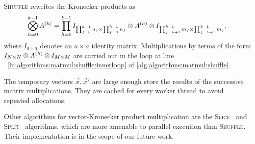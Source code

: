 \begin{itemize}
  \textsc{Shuffle} rewrites the Kronecker products as
  \begin{equation}
    \bigotimes_{h = 0}^{k - 1} A^{(h)} = \prod_{h = 0}^{k - 1}
    I_{\prod_{f = 0}^{h - 1} n_f \times \prod_{f = 0}^{h - 1} n_f} \otimes
    A^{(h)} \otimes I_{\prod_{f = h + 1}^{k - 1} m_f \times
      \prod_{f = h + 1}^{k - 1} m_f} \text,
  \end{equation}
  where $I_{a \times a}$ denotes an $a \times a$ identity matrix.
  Multiplications by terms of the form
  $I_{N \times N} \otimes A^{(h)} \otimes I_{M \times M}$ are
  carried out in the loop at line%
  ~\ref{ln:algorithms:matmul:shuffle:innerloop} of
  \cref{alg:algorithms:matmul:shuffle}.

  The temporary vectors $\vec{x}, \vec{x}'$ are large enough store the
  results of the successive matrix multiplications. They are cached
  for every worker thread to avoid repeated allocations.

  Other algorithms for vector-Kronecker product multiplication are the
  \textsc{Slice}~\citep{fernandes2005alternative} and \textsc{Split}~%
  \citep{DBLP:conf/springsim/CzeksterRFLW10} algorithms, which are
  more amenable to parallel execution than \textsc{Shuffle}. Their
  implementation is in the scope of our future work.
\end{itemize}
